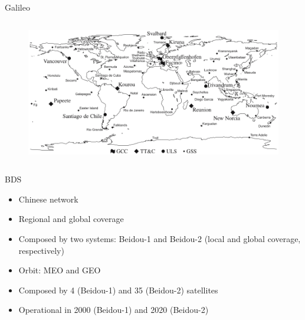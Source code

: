 \begin{frame}{Galileo}
\begin{columns}[t]
\begin{column}[t]{0.6\textwidth}
            \begin{figure}[!ht]
                \begin{center}
                    \includegraphics[width=0.9\columnwidth]{figures/galileo-ground-segment}
                \end{center}
            \end{figure}
        \end{column}
    \end{columns}

\end{frame}

\begin{frame}{BDS}

    \begin{itemize}
        \item Chinese network
        \vspace{0.2cm}
        \item Regional and global coverage
        \vspace{0.2cm}
        \item Composed by two systems: Beidou-1 and Beidou-2 (local and global coverage, respectively)
        \vspace{0.2cm}
        \item Orbit: MEO and GEO
        \vspace{0.2cm}
        \item Composed by 4 (Beidou-1) and 35 (Beidou-2) satellites
        \vspace{0.2cm}
        \item Operational in 2000 (Beidou-1) and 2020 (Beidou-2)
    \end{itemize}

\end{frame}

